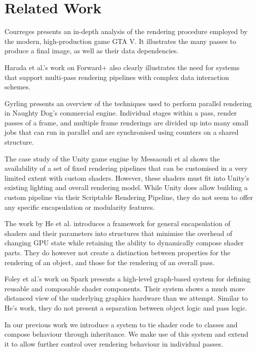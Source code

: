 \documentclass[format=sigconf]{acmart}
\begin{document}
\section{Related Work}\label{relatedwork}
Courreges\cite{gtav} presents an in-depth analysis of the rendering procedure employed by the modern, high-production game GTA V. It illustrates the many passes to produce a final image, as well as their data dependencies.

Harada et al.'s work on Forward+\cite{forward+}\cite{forward+talk} also clearly illustrates the need for systems that support multi-pass rendering pipelines with complex data interaction schemes.

Gyrling\cite{fibers} presents an overview of the techniques used to perform parallel rendering in Naughty Dog's commercial engine. Individual stages within a pass, render passes of a frame, and multiple frame renderings are divided up into many small jobs that can run in parallel and are synchronised using counters on a shared structure.

The case study of the Unity game engine by Messaoudi et al\cite{unity} shows the availability of a set of fixed rendering pipelines that can be customised in a very limited extent with custom shaders. However, these shaders must fit into Unity's existing lighting and overall rendering model. While Unity does allow building a custom pipeline via their Scriptable Rendering Pipeline\cite{unitycustom}, they do not seem to offer any specific encapsulation or modularity features.

The work by He et al.\cite{components} introduces a framework for general encapsulation of shaders and their parameters into structures that minimise the overhead of changing GPU state while retaining the ability to dynamically compose shader parts. They do however not create a distinction between properties for the rendering of an object, and those for the rendering of an overall pass.

Foley et al.'s work on Spark\cite{spark} presents a high-level graph-based system for defining reusable and composable shader components. Their system shows a much more distanced view of the underlying graphics hardware than we attempt. Similar to He's work, they do not present a separation between object logic and pass logic.

In our previous work\cite{glsloop} we introduce a system to tie shader code to classes and compose behaviour through inheritance. We make use of this system and extend it to allow further control over rendering behaviour in individual passes.
\end{document}
